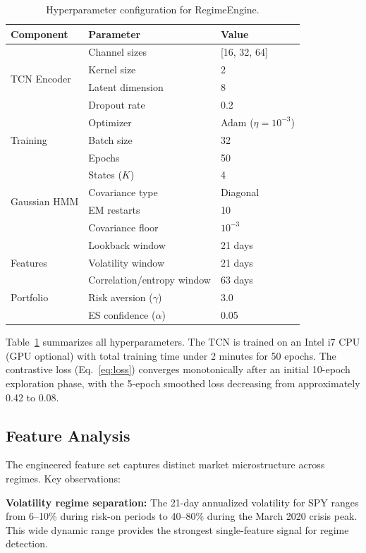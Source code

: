 \begin{table}[t]
\centering
\caption{Hyperparameter configuration for RegimeEngine.}
\label{tab:hyperparams}
\begin{tabular}{@{}lll@{}}
\toprule
\textbf{Component} & \textbf{Parameter} & \textbf{Value} \\
\midrule
\multirow{4}{*}{TCN Encoder}
    & Channel sizes & [16, 32, 64] \\
    & Kernel size & 2 \\
    & Latent dimension & 8 \\
    & Dropout rate & 0.2 \\
\midrule
\multirow{3}{*}{Training}
    & Optimizer & Adam ($\eta\!=\!10^{-3}$) \\
    & Batch size & 32 \\
    & Epochs & 50 \\
\midrule
\multirow{4}{*}{Gaussian HMM}
    & States ($K$) & 4 \\
    & Covariance type & Diagonal \\
    & EM restarts & 10 \\
    & Covariance floor & $10^{-3}$ \\
\midrule
\multirow{3}{*}{Features}
    & Lookback window & 21 days \\
    & Volatility window & 21 days \\
    & Correlation/entropy window & 63 days \\
\midrule
Portfolio & Risk aversion ($\gamma$) & 3.0 \\
          & ES confidence ($\alpha$) & 0.05 \\
\bottomrule
\end{tabular}
\end{table}

Table~\ref{tab:hyperparams} summarizes all hyperparameters. The TCN is trained on an Intel i7 CPU (GPU optional) with total training time under 2 minutes for 50 epochs. The contrastive loss (Eq.~\ref{eq:loss}) converges monotonically after an initial 10-epoch exploration phase, with the 5-epoch smoothed loss decreasing from approximately 0.42 to 0.08.

\subsection{Feature Analysis}

The engineered feature set captures distinct market microstructure across regimes. Key observations:

\textbf{Volatility regime separation:} The 21-day annualized volatility for SPY ranges from 6--10\% during risk-on periods to 40--80\% during the March 2020 crisis peak. This wide dynamic range provides the strongest single-feature signal for regime detection.

